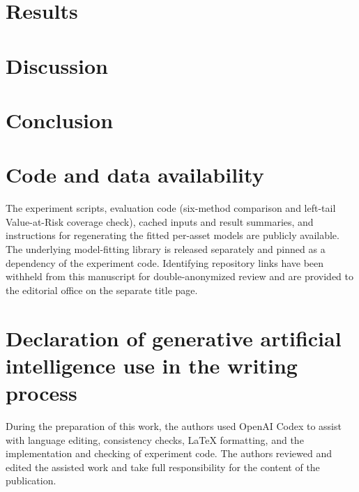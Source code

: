 \documentclass[preprint,authoryear,doubleblind]{elsarticle}
\begin{document}
\section{Results}\label{sec:results}


\section{Discussion}\label{sec:discussion}


\section{Conclusion}\label{sec:conclusion}


\section*{Code and data availability}
The experiment scripts, evaluation code (six-method comparison and
left-tail Value-at-Risk coverage check), cached
inputs and result summaries, and instructions for regenerating the
fitted per-asset models are publicly available. The underlying model-fitting library is released
separately and pinned as a dependency of the experiment code.
Identifying repository links have been withheld from this
manuscript for double-anonymized review and are provided to the
editorial office on the separate title page.

\section*{Declaration of generative artificial intelligence use in the writing process}
During the preparation of this work, the authors used OpenAI Codex to
assist with language editing, consistency checks, LaTeX formatting,
and the implementation and checking of experiment code. The authors
reviewed and edited the assisted work and take full responsibility for
the content of the publication.



\end{document}
